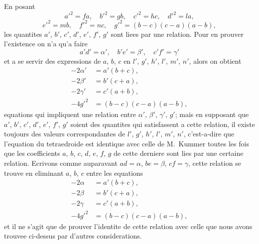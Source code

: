 \documentclass[11pt,a4paper]{article}
\theoremstyle{plain}
\begin{document}
En posant
\[
a'^2 = fa, \quad b'^2 = gb, \quad c'^2 = hc, \quad d'^2 = la,
\]
\[
e'^2 = mb, \quad f'^2 = nc, \quad g'^2 = (b-c)(c-a)(a-b),
\]
les quantites $a'$, $b'$, $c'$, $d'$, $e'$, $f'$, $g'$ sont liees par une relation. Pour en prouver l'existence on n'a qu'a faire
\[
a'd' = \alpha', \quad b'e' = \beta', \quad c'f' = \gamma'
\]
et a se servir des expressions de $a$, $b$, $c$ en $l'$, $g'$, $h'$, $l'$, $m'$, $n'$, alors on obtient
\begin{align*}
-2\alpha' &= a'(b+c), \\
-2\beta' &= b'(c+a), \\
-2\gamma' &= c'(a+b), \\
-4g'^2 &= (b-c)(c-a)(a-b),
\end{align*}
equations qui impliquent une relation entre $\alpha'$, $\beta'$, $\gamma'$, $g'$; mais en supposant que $a'$, $b'$, $c'$, $d'$, $e'$, $f'$, $g'$ soient des quantites qui satisfassent a cette relation, il existe toujours des valeurs correspondantes de $l'$, $g'$, $h'$, $l'$, $m'$, $n'$, c'est-a-dire que l'equation du tetraedroide est identique avec celle de M.~Kummer toutes les fois que les coefficients $a$, $b$, $c$, $d$, $e$, $f$, $g$ de cette derniere sont lies par une certaine relation. Ecrivons comme auparavant $ad = \alpha$, $be = \beta$, $cf = \gamma$, cette relation se trouve en eliminant $a$, $b$, $c$ entre les equations
\begin{align*}
-2\alpha &= a'(b+c), \\
-2\beta &= b'(c+a), \\
-2\gamma &= c'(a+b), \\
-4g'^2 &= (b-c)(c-a)(a-b),
\end{align*}
et il ne s'agit que de prouver l'identite de cette relation avec celle que nous avons trouvee ci-dessus par d'autres considerations.
\end{document}
